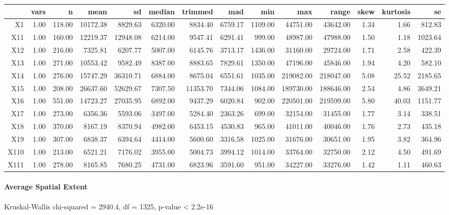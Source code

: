 \begin{tabular}{rrrrrrrrrrrrrr}
  \hline
 & vars & n & mean & sd & median & trimmed & mad & min & max & range & skew & kurtosis & se \\ 
  \hline
X1 & 1.00 & 118.00 & 10172.38 & 8829.63 & 6320.00 & 8834.40 & 6759.17 & 1109.00 & 44751.00 & 43642.00 & 1.34 & 1.66 & 812.83 \\ 
  X11 & 1.00 & 160.00 & 12219.37 & 12948.08 & 6214.00 & 9547.41 & 6291.41 & 999.00 & 48987.00 & 47988.00 & 1.50 & 1.18 & 1023.64 \\ 
  X12 & 1.00 & 216.00 & 7325.81 & 6207.77 & 5007.00 & 6145.76 & 3713.17 & 1436.00 & 31160.00 & 29724.00 & 1.71 & 2.58 & 422.39 \\ 
  X13 & 1.00 & 271.00 & 10553.42 & 9582.49 & 8387.00 & 8883.65 & 7829.61 & 1350.00 & 47196.00 & 45846.00 & 1.94 & 4.20 & 582.10 \\ 
  X14 & 1.00 & 276.00 & 15747.29 & 36310.71 & 6884.00 & 8675.04 & 6551.61 & 1035.00 & 219082.00 & 218047.00 & 5.08 & 25.52 & 2185.65 \\ 
  X15 & 1.00 & 208.00 & 26637.60 & 52629.67 & 7307.50 & 11353.70 & 7344.06 & 1084.00 & 189730.00 & 188646.00 & 2.54 & 4.86 & 3649.21 \\ 
  X16 & 1.00 & 551.00 & 14723.27 & 27035.95 & 6892.00 & 9437.29 & 6020.84 & 902.00 & 220501.00 & 219599.00 & 5.80 & 40.03 & 1151.77 \\ 
  X17 & 1.00 & 273.00 & 6356.36 & 5593.06 & 3497.00 & 5284.40 & 2363.26 & 699.00 & 32154.00 & 31455.00 & 1.77 & 3.14 & 338.51 \\ 
  X18 & 1.00 & 370.00 & 8167.19 & 8370.94 & 4982.00 & 6453.15 & 4530.83 & 965.00 & 41011.00 & 40046.00 & 1.76 & 2.73 & 435.18 \\ 
  X19 & 1.00 & 307.00 & 6838.37 & 6394.64 & 4414.00 & 5600.60 & 3316.58 & 1025.00 & 31676.00 & 30651.00 & 1.95 & 3.82 & 364.96 \\ 
  X110 & 1.00 & 213.00 & 6521.21 & 7176.02 & 3955.00 & 5004.73 & 3994.12 & 1014.00 & 33764.00 & 32750.00 & 2.12 & 4.50 & 491.69 \\ 
  X111 & 1.00 & 278.00 & 8165.85 & 7680.25 & 4731.00 & 6823.96 & 3591.60 & 951.00 & 34227.00 & 33276.00 & 1.42 & 1.11 & 460.63 \\ 
   \hline
\end{tabular}

\paragraph{Average Spatial Extent}
Kruskal-Wallis chi-squared = 2940.4, df = 1325, p-value < 2.2e-16

